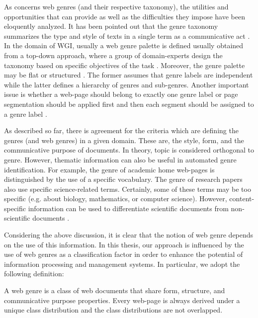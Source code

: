 As concerns web genres (and their respective taxonomy), the utilities and opportunities that can provide as well as the difficulties they impose have been eloquently analyzed. It has been pointed out that the genre taxonomy summarizes the type and style of texts in a single term as a communicative act \parencite{de2009genre}. In the domain of WGI, usually a web genre palette is defined usually obtained from a top-down approach, where a group of domain-experts design the taxonomy based on specific objectives of the task \parencite{crowston2011problems}. Moreover, the genre palette may be flat or structured \parencite{wu2010fine}. The former assumes that genre labels are independent while the latter defines a hierarchy of genres and sub-genres. Another important issue is whether a web-page should belong to exactly one genre label or page segmentation should be applied first and then each segment should be assigned to a genre label  \parencite{madjarov2015web,jebari2015combination}. 

As described so far, there is agreement for the criteria which are defining the genres (and web genres) in a given domain. These are, the style, form, and the communicative purpose of documents. In theory, topic is considered orthogonal to genre. However, thematic information can also be useful in automated genre identification. For example, the genre of academic home web-pages is distinguished by the use of a specific vocabulary. The genre of research papers also use specific science-related terms. Certainly, some of these terms may be too specific (e.g. about biology, mathematics, or computer science). However, content-specific information can be used to differentiate scientific documents from non-scientific documents \parencite{coutinho2009describe,crowston2011problems,kanaris2009learning,jebari2015combination,gollapalli2011identifying}. 

Considering the above discussion, it is clear that the notion of web genre depends on the use of this information. In this thesis, our approach is influenced by the use of web genres as a classification factor in order to enhance the potential of information processing and management systems. In particular, we adopt the following definition:

\begin{definition} A web genre is a class of web documents that share form, structure, and communicative purpose properties. Every web-page is always derived under a unique class distribution and the class distributions are not overlapped.
\end{definition}

